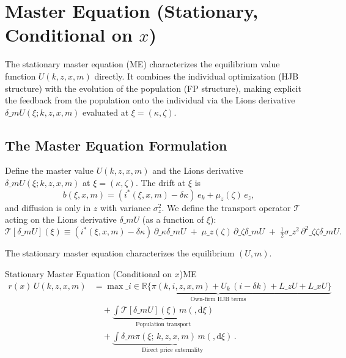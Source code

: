 \documentclass[11pt,letterpaper,oneside]{article}
\numberwithin{equation}{section}
\newcommand{\R}{\mathbb{R}}
\newcommand{\1}{\mathbf{1}}
\newcommand{\diff}{,\mathrm{d}}
\newcommand{\Lz}{L\_z}
\newcommand{\Lx}{L\_x}
\newcommand{\dmU}{\delta\_m U}
\begin{document}
\section[Master Equation (Stationary, Conditional on x)]{Master Equation (Stationary, Conditional on $x$)}\label{sec:master-equation}
The stationary master equation (ME) characterizes the equilibrium value function $U(k,z,x,m)$ directly. It combines the individual optimization (HJB structure) with the evolution of the population (FP structure), making explicit the feedback from the population onto the individual via the Lions derivative $\dmU(\xi;k,z,x,m)$ evaluated at $\xi=(\kappa,\zeta)$.

\subsection{The Master Equation Formulation}\label{sec:me-formulation}

Define the master value $U(k,z,x,m)$ and the Lions derivative $\dmU(\xi;k,z,x,m)$ at $\xi=(\kappa,\zeta)$. The drift at $\xi$ is
\[
b(\xi,x,m)=(i^*(\xi,x,m)-\delta\kappa)\,e_k+\mu_z(\zeta)\,e_z,
\]
and diffusion is only in $z$ with variance $\sigma_z^2$. We define the transport operator $\mathcal{T}$ acting on the Lions derivative $\dmU$ (as a function of $\xi$):
\[
\mathcal{T}[\dmU](\xi) \equiv (i^*(\xi,x,m)-\delta\kappa)\,\partial\_\kappa\dmU
\; +\; \mu\_z(\zeta)\,\partial\_\zeta\dmU
\; +\; \tfrac12\sigma\_z^2\,\partial^2\_{\zeta\zeta}\dmU.
\]

The stationary master equation characterizes the equilibrium $(U,m)$.

\begin{theorem}{Stationary Master Equation (Conditional on $x$)}{ME}
\begin{equation}
\boxed{\begin{aligned}
r(x)\,U(k,z,x,m) &= \underbrace{\max\_{i\in\R}\big\{\pi(k,i,z,x,m) + U_k\,(i-\delta k) + \Lz U + \Lx U\big\}}_{\text{Own-firm HJB terms}} \\
&\quad + \underbrace{\int \mathcal{T}[\dmU](\xi)\, m(\diff \xi)}_{\text{Population transport}} \\
&\quad + \underbrace{\int \delta\_m \pi(\xi;\,k,z,x,m)\, m(\diff \xi)}_{\text{Direct price externality}}\,.
\end{aligned}}
\tag{ME}\label{eq:ME}
\end{equation}
\end{theorem}
\end{document}
